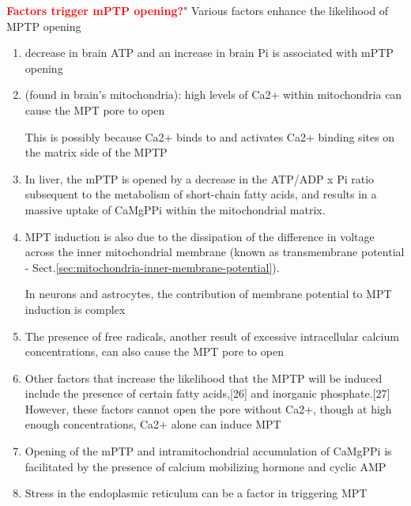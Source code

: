 \textcolor{red}{\bf Factors trigger mPTP opening?}" Various factors enhance the
likelihood of MPTP opening
\begin{enumerate}

  \item decrease in brain ATP and an increase in brain Pi is associated with
  mPTP opening

  \item (found in brain's mitochondria): high levels of Ca2+ within mitochondria
  can cause the MPT pore to open

This is possibly because Ca2+ binds to and activates Ca2+ binding sites on the
matrix side of the MPTP

   \item In liver, the mPTP is opened by a decrease in the ATP/ADP x Pi ratio
   subsequent to the metabolism of short-chain fatty acids, and results in a
   massive uptake of CaMgPPi within the mitochondrial matrix.

  \item MPT induction is also due to the dissipation of the difference in
  voltage across the inner mitochondrial membrane (known as transmembrane
  potential - Sect.\ref{sec:mitochondria-inner-membrane-potential}).

In neurons and astrocytes, the contribution of membrane potential to MPT
induction is complex

  \item The presence of free radicals, another result of excessive intracellular
  calcium concentrations, can also cause the MPT pore to open

  \item Other factors that increase the likelihood that the MPTP will be induced
  include the presence of certain fatty acids,[26] and inorganic phosphate.[27]
  However, these factors cannot open the pore without Ca2+, though at high
  enough concentrations, Ca2+ alone can induce MPT

  \item Opening of the mPTP and intramitochondrial accumulation of CaMgPPi is
  facilitated by the presence of calcium mobilizing hormone and cyclic AMP

  \item Stress in the endoplasmic reticulum can be a factor in triggering MPT
\end{enumerate}


